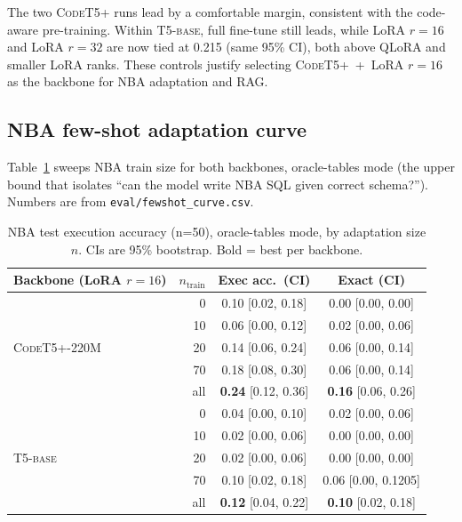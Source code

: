 \documentclass[11pt,a4paper]{article}
\newcommand{\codet}{\textsc{CodeT5+}}
\newcommand{\tfive}{\textsc{T5-base}}
\begin{document}
The two \codet{} runs lead by a comfortable margin, consistent with the
code-aware pre-training. Within \tfive{}, full fine-tune still leads, while
LoRA $r{=}16$ and LoRA $r{=}32$ are now tied at 0.215 (same 95\% CI), both
above QLoRA and smaller LoRA ranks. These controls justify selecting \codet{}~+~LoRA $r{=}16$ as the
backbone for NBA adaptation and RAG.

\subsection{NBA few-shot adaptation curve}
\label{sec:fewshot}

Table~\ref{tab:fewshot} sweeps NBA train size for both backbones, oracle-tables
mode (the upper bound that isolates ``can the model write NBA SQL given
correct schema?''). Numbers are from \texttt{eval/fewshot\_curve.csv}.

\begin{table}[h]
\centering
\caption{NBA test execution accuracy (n{=}50), oracle-tables mode, by
adaptation size $n$. CIs are 95\% bootstrap. Bold = best per backbone.}
\label{tab:fewshot}
\small
\begin{tabular}{l r c c}
\toprule
Backbone (LoRA $r{=}16$) & $n_{\text{train}}$ & Exec acc.\ (CI) & Exact (CI) \\
\midrule
\multirow{5}{*}{\codet{}-220M}
    & 0   & 0.10 [0.02, 0.18]  & 0.00 [0.00, 0.00] \\
    & 10  & 0.06 [0.00, 0.12]  & 0.02 [0.00, 0.06] \\
    & 20  & 0.14 [0.06, 0.24]  & 0.06 [0.00, 0.14] \\
    & 70  & 0.18 [0.08, 0.30]  & 0.06 [0.00, 0.14] \\
    & all & \textbf{0.24} [0.12, 0.36] & \textbf{0.16} [0.06, 0.26] \\
\midrule
\multirow{5}{*}{\tfive{}}
    & 0   & 0.04 [0.00, 0.10]  & 0.02 [0.00, 0.06] \\
    & 10  & 0.02 [0.00, 0.06]  & 0.00 [0.00, 0.00] \\
    & 20  & 0.02 [0.00, 0.06]  & 0.00 [0.00, 0.00] \\
    & 70  & 0.10 [0.02, 0.18]  & 0.06 [0.00, 0.1205] \\
    & all & \textbf{0.12} [0.04, 0.22] & \textbf{0.10} [0.02, 0.18] \\
\bottomrule
\end{tabular}
\end{table}
\end{document}
